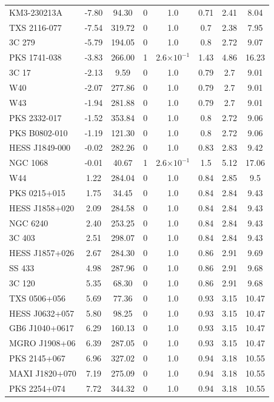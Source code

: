 \begin{longtable}{lccccccc}
KM3-230213A	&	-7.80	&	94.30	&	0	&	1.0	&	0.71	&	2.41	&	8.04	\\ 
TXS 2116-077	&	-7.54	&	319.72	&	0	&	1.0	&	0.7	&	2.38	&	7.95	\\ 
3C 279	&	-5.79	&	194.05	&	0	&	1.0	&	0.8	&	2.72	&	9.07	\\ 
PKS 1741-038	&	-3.83	&	266.00	&	1	&	2.6$\times 10^{-1}$	&	1.43	&	4.86	&	16.23	\\ 
3C 17	&	-2.13	&	9.59	&	0	&	1.0	&	0.79	&	2.7	&	9.01	\\ 
W40	&	-2.07	&	277.86	&	0	&	1.0	&	0.79	&	2.7	&	9.01	\\ 
W43	&	-1.94	&	281.88	&	0	&	1.0	&	0.79	&	2.7	&	9.01	\\ 
PKS 2332-017	&	-1.52	&	353.84	&	0	&	1.0	&	0.8	&	2.72	&	9.06	\\ 
PKS B0802-010	&	-1.19	&	121.30	&	0	&	1.0	&	0.8	&	2.72	&	9.06	\\ 
HESS J1849-000	&	-0.02	&	282.26	&	0	&	1.0	&	0.83	&	2.83	&	9.42	\\ 
NGC 1068	&	-0.01	&	40.67	&	1	&	2.6$\times 10^{-1}$	&	1.5	&	5.12	&	17.06	\\ 
W44	&	1.22	&	284.04	&	0	&	1.0	&	0.84	&	2.85	&	9.5	\\ 
PKS 0215+015	&	1.75	&	34.45	&	0	&	1.0	&	0.84	&	2.84	&	9.43	\\ 
HESS J1858+020	&	2.09	&	284.58	&	0	&	1.0	&	0.84	&	2.84	&	9.43	\\ 
NGC 6240	&	2.40	&	253.25	&	0	&	1.0	&	0.84	&	2.84	&	9.43	\\ 
3C 403	&	2.51	&	298.07	&	0	&	1.0	&	0.84	&	2.84	&	9.43	\\ 
HESS J1857+026	&	2.67	&	284.30	&	0	&	1.0	&	0.86	&	2.91	&	9.69	\\ 
SS 433	&	4.98	&	287.96	&	0	&	1.0	&	0.86	&	2.91	&	9.68	\\ 
3C 120	&	5.35	&	68.30	&	0	&	1.0	&	0.86	&	2.91	&	9.68	\\ 
TXS 0506+056	&	5.69	&	77.36	&	0	&	1.0	&	0.93	&	3.15	&	10.47	\\ 
HESS J0632+057	&	5.80	&	98.25	&	0	&	1.0	&	0.93	&	3.15	&	10.47	\\ 
GB6 J1040+0617	&	6.29	&	160.13	&	0	&	1.0	&	0.93	&	3.15	&	10.47	\\ 
MGRO J1908+06	&	6.39	&	287.05	&	0	&	1.0	&	0.93	&	3.15	&	10.47	\\ 
PKS 2145+067	&	6.96	&	327.02	&	0	&	1.0	&	0.94	&	3.18	&	10.55	\\ 
MAXI J1820+070	&	7.19	&	275.09	&	0	&	1.0	&	0.94	&	3.18	&	10.55	\\ 
PKS 2254+074	&	7.72	&	344.32	&	0	&	1.0	&	0.94	&	3.18	&	10.55	\\ 

\end{longtable}
